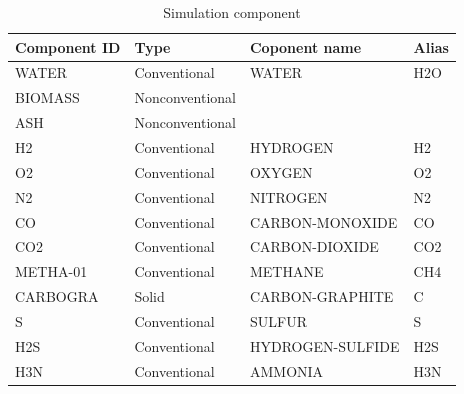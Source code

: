 \begin{table}[h!]
	\centering
	{\small{
	\begin{tabular}{ l|l|l|l } 
		\hline
		Component ID&	Type			&	Coponent name	&	Alias\\
		\hline 													
		WATER		&	Conventional	&	WATER			&	H2O	\\
		BIOMASS		&	Nonconventional	&					&		\\		
		ASH			&	Nonconventional	&					&		\\
		H2			&	Conventional	&	HYDROGEN		&	H2	\\
		O2			&	Conventional	&	OXYGEN			&	O2	\\
		N2			&	Conventional	&	NITROGEN		&	N2	\\
		CO			&	Conventional	&	CARBON-MONOXIDE	&	CO	\\
		CO2			&	Conventional	&	CARBON-DIOXIDE	&	CO2	\\
		METHA-01	&	Conventional	&	METHANE			&	CH4	\\
		CARBOGRA	&	Solid			&	CARBON-GRAPHITE	&	C	\\
		S			&	Conventional	&	SULFUR			&	S 	\\
		H2S			&	Conventional	&	HYDROGEN-SULFIDE&	H2S	\\
		H3N			&	Conventional	&	AMMONIA			&	H3N \\
		\hline
	\end{tabular}}}
	\caption{Simulation component}
	\label{tbl:Gasification_Components}
\end{table}

